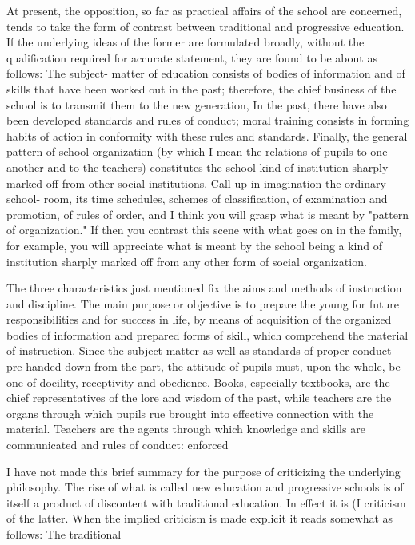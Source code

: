 At present, the opposition, so far as practical affairs of the school are concerned, tends 
to take the form of contrast between traditional and progressive education. If the 
underlying ideas of the former are formulated broadly, without the qualification required 
for accurate statement, they are found to be about as follows: The subject- matter of 
education consists of bodies of information and of skills that have been worked out in the 
past; therefore, the chief business of the school is to transmit them to the new generation, 
In the past, there have also been developed standards and rules of conduct; moral training 
consists in forming habits of action in conformity with these rules and standards. Finally, 
the general pattern of school organization (by which I mean the relations of pupils to one 
another and to the teachers) constitutes the school kind of institution sharply marked off 
from other social institutions. Call up in imagination the ordinary school- room, its time 
schedules, schemes of classification, of examination and promotion, of rules of order, and 
I think you will grasp what is meant by "pattern of organization." If then you contrast this 
scene with what goes on in the family, for example, you will appreciate what is meant by 
the school being a kind of institution sharply marked off from any other form of social 
organization. 

The three characteristics just mentioned fix the aims and methods of instruction and 
discipline. The main purpose or objective is to prepare the young for future 
responsibilities and for success in life, by means of acquisition of the organized bodies of 
information and prepared forms of skill, which comprehend the material of instruction. 
Since the subject matter as well as standards of proper conduct pre handed down from the 
part, the attitude of pupils must, upon the whole, be one of docility, receptivity and 
obedience. Books, especially textbooks, are the chief representatives of the lore and 
wisdom of the past, while teachers are the organs through which pupils rue brought into 
effective connection with the material. Teachers are the agents through which knowledge 
and skills are communicated and rules of conduct: enforced 

I have not made this brief summary for the purpose of criticizing the underlying 
philosophy. The rise of what is called new education and progressive schools is of itself a 
product of discontent with traditional education. In effect it is (I criticism of the latter. 
When the implied criticism is made explicit it reads somewhat as follows: The traditional 


